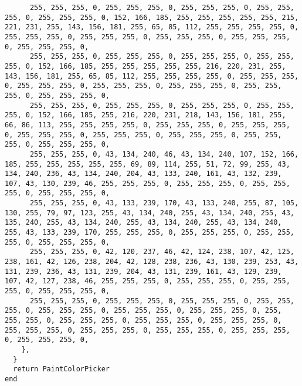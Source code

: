\documentclass{ctexart}
\begin{document}
\begin{lstlisting}
      255, 255, 255, 0, 255, 255, 255, 0, 255, 255, 255, 0, 255, 255, 255, 0, 255, 255, 255, 0, 152, 166, 185, 255, 255, 255, 255, 255, 215, 221, 231, 255, 143, 156, 181, 255, 65, 85, 112, 255, 255, 255, 255, 0, 255, 255, 255, 0, 255, 255, 255, 0, 255, 255, 255, 0, 255, 255, 255, 0, 255, 255, 255, 0, 
      255, 255, 255, 0, 255, 255, 255, 0, 255, 255, 255, 0, 255, 255, 255, 0, 152, 166, 185, 255, 255, 255, 255, 255, 216, 220, 231, 255, 143, 156, 181, 255, 65, 85, 112, 255, 255, 255, 255, 0, 255, 255, 255, 0, 255, 255, 255, 0, 255, 255, 255, 0, 255, 255, 255, 0, 255, 255, 255, 0, 255, 255, 255, 0, 
      255, 255, 255, 0, 255, 255, 255, 0, 255, 255, 255, 0, 255, 255, 255, 0, 152, 166, 185, 255, 216, 220, 231, 218, 143, 156, 181, 255, 66, 86, 113, 255, 255, 255, 255, 0, 255, 255, 255, 0, 255, 255, 255, 0, 255, 255, 255, 0, 255, 255, 255, 0, 255, 255, 255, 0, 255, 255, 255, 0, 255, 255, 255, 0, 
      255, 255, 255, 0, 43, 134, 240, 46, 43, 134, 240, 107, 152, 166, 185, 255, 255, 255, 255, 255, 69, 89, 114, 255, 51, 72, 99, 255, 43, 134, 240, 236, 43, 134, 240, 204, 43, 133, 240, 161, 43, 132, 239, 107, 43, 130, 239, 46, 255, 255, 255, 0, 255, 255, 255, 0, 255, 255, 255, 0, 255, 255, 255, 0, 
      255, 255, 255, 0, 43, 133, 239, 170, 43, 133, 240, 255, 87, 105, 130, 255, 79, 97, 123, 255, 43, 134, 240, 255, 43, 134, 240, 255, 43, 135, 240, 255, 43, 134, 240, 255, 43, 134, 240, 255, 43, 134, 240, 255, 43, 133, 239, 170, 255, 255, 255, 0, 255, 255, 255, 0, 255, 255, 255, 0, 255, 255, 255, 0, 
      255, 255, 255, 0, 42, 120, 237, 46, 42, 124, 238, 107, 42, 125, 238, 161, 42, 126, 238, 204, 42, 128, 238, 236, 43, 130, 239, 253, 43, 131, 239, 236, 43, 131, 239, 204, 43, 131, 239, 161, 43, 129, 239, 107, 42, 127, 238, 46, 255, 255, 255, 0, 255, 255, 255, 0, 255, 255, 255, 0, 255, 255, 255, 0, 
      255, 255, 255, 0, 255, 255, 255, 0, 255, 255, 255, 0, 255, 255, 255, 0, 255, 255, 255, 0, 255, 255, 255, 0, 255, 255, 255, 0, 255, 255, 255, 0, 255, 255, 255, 0, 255, 255, 255, 0, 255, 255, 255, 0, 255, 255, 255, 0, 255, 255, 255, 0, 255, 255, 255, 0, 255, 255, 255, 0, 255, 255, 255, 0, 
    },
  }
  return PaintColorPicker
end


\end{lstlisting}
\end{document}
